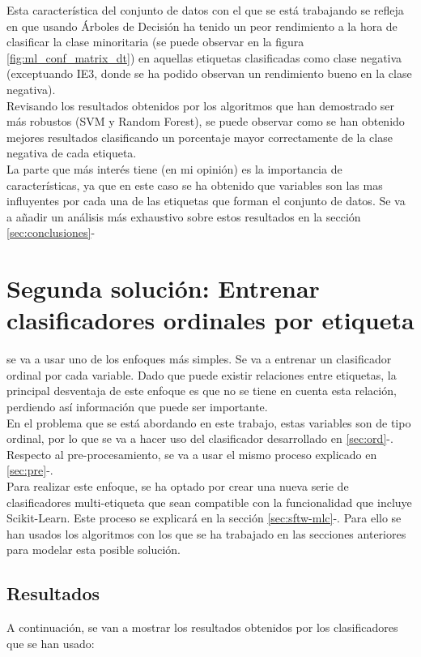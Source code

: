 Esta característica del conjunto de datos con el que se está trabajando se refleja en que usando Árboles de Decisión ha tenido un peor rendimiento a la hora de clasificar la clase minoritaria (se puede observar en la figura \ref{fig:ml_conf_matrix_dt}) en aquellas etiquetas clasificadas como clase negativa (exceptuando IE3, donde se ha podido observan un rendimiento bueno en la clase negativa).\\
Revisando los resultados obtenidos por los algoritmos que han demostrado ser más robustos (SVM y Random Forest), se puede observar como se han obtenido mejores resultados clasificando un porcentaje mayor correctamente de la clase negativa de cada etiqueta.\\
\linebreak
La parte que más interés tiene (en mi opinión) es la importancia de características, ya que en este caso se ha obtenido que variables son las mas influyentes por cada una de las etiquetas que forman el conjunto de datos. Se va a añadir un análisis más exhaustivo sobre estos resultados en la sección \ref{sec:conclusiones}-
\clearpage
\section{Segunda solución: Entrenar clasificadores ordinales por etiqueta}
se va a usar uno de los enfoques más simples. Se va a entrenar un clasificador ordinal por cada variable.
Dado que puede existir relaciones entre etiquetas, la principal desventaja de este enfoque es que no se tiene en cuenta esta relación, perdiendo así información que puede ser importante.\\
\linebreak
En el problema que se está abordando en este trabajo, estas variables son de tipo ordinal, por lo que se va a hacer uso del clasificador desarrollado en \ref{sec:ord}-.
Respecto al pre-procesamiento, se va a usar el mismo proceso explicado en \ref{sec:pre}-.\\

Para realizar este enfoque, se ha optado por crear una nueva serie de clasificadores multi-etiqueta que sean compatible con la funcionalidad que incluye Scikit-Learn. Este proceso se explicará en la sección \ref{sec:sftw-mlc}-. Para ello se han usados los algoritmos con los que se ha trabajado en las secciones anteriores para modelar esta posible solución.
\subsection{Resultados}
A continuación, se van a mostrar los resultados obtenidos por los clasificadores que se han usado:
